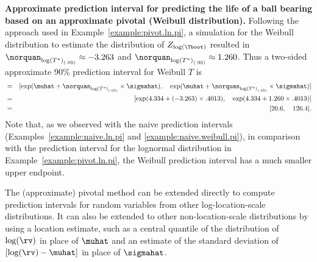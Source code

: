 \begin{example}
\label{example:pivot.weib.pi}
{\bf Approximate prediction interval for predicting the life of a
ball bearing based on an approximate pivotal (Weibull
distribution).} Following the approach used in
Example~\ref{example:pivot.ln.pi}, a simulation for the
Weibull distribution to estimate the distribution of
$Z_{\log(\Tboot)}$ resulted in $\norquan_{{\log(T^{*})}_{(.05)}}
\approx -3.263$ and $\norquan_{{\log(T^{*})}_{(.95)}} \approx
1.260$. Thus a two-sided approximate 90\% prediction interval for
Weibull $T$ is
\begin{eqnarray*}
[ \Tlower, \quad \Tupper ]& = &
	[ \exp(\muhat +\norquan_{{\log(T^{*})}_{(.05)}} \times \sigmahat), 
	\quad \exp(\muhat +\norquan_{{\log(T^{*})}_{(.95)}} \times \sigmahat) ]\\& = &
	[ \exp(4.334 +(-3.263) \times .4013), \quad 
\exp(4.334 + 1.260 \times .4013) ]\\ & = &
	[ 20.6, \quad 126.4].
\end{eqnarray*}
Note that, as we observed with the naive prediction intervals
(Examples~\ref{example:naive.ln.pi} and
\ref{example:naive.weibull.pi}), in comparison with the prediction
interval for the lognormal distribution in
Example~\ref{example:pivot.ln.pi}, the Weibull prediction interval has
a much smaller upper endpoint.
\end{example}

The (approximate) pivotal method can be extended directly to compute
prediction intervals for random variables from other
log-location-scale distributions.  It can also be extended to other
non-location-scale distributions by using a location estimate, such
as a central quantile of the distribution of $\log(\rv)$ in place of
$\muhat$ and an estimate of the standard deviation of
$[\log(\rv)-\muhat]$ in place of $\sigmahat$.

